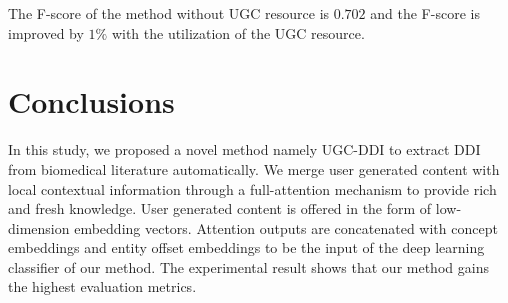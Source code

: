 \documentclass[conference]{IEEEtran}
\begin{document}
The F-score of the method without UGC resource is $0.702$ and the F-score is improved by $1\%$ with the utilization of the UGC resource.



\section{Conclusions}
\label{sec:conclusions}

In this study, we proposed a novel method namely UGC-DDI to extract DDI from biomedical literature automatically.
We merge user generated content with local contextual information through a full-attention mechanism to provide rich and fresh knowledge.
User generated content is offered in the form of low-dimension embedding vectors.
Attention outputs are concatenated with concept embeddings and entity offset embeddings to be the input of the deep learning classifier of our method.
The experimental result shows that our method gains the highest evaluation metrics.



\end{document}
